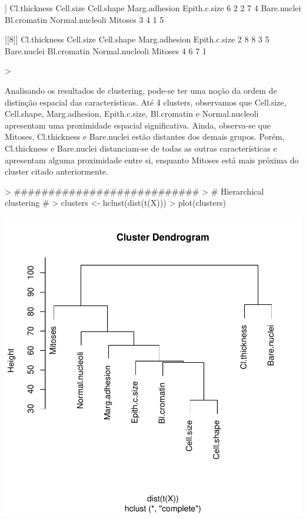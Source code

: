 \documentclass{article}
\begin{document}
\begin{Schunk}
\begin{Soutput}
[[7]]
   Cl.thickness       Cell.size      Cell.shape   Marg.adhesion    Epith.c.size 
              6               2               2               7               4 
    Bare.nuclei     Bl.cromatin Normal.nucleoli         Mitoses 
              3               4               1               5 

[[8]]
   Cl.thickness       Cell.size      Cell.shape   Marg.adhesion    Epith.c.size 
              2               8               8               3               5 
    Bare.nuclei     Bl.cromatin Normal.nucleoli         Mitoses 
              4               6               7               1 
\end{Soutput}
\begin{Sinput}
> 
\end{Sinput}
\end{Schunk}
Analisando os resultados de clustering, pode-se ter uma noção da ordem de distinção espacial das características. Até 4 clusters, observamos que Cell.size, Cell.shape, Marg.adhesion, Epith.c.size, Bl.cromatin e Normal.nucleoli apresentam uma proximidade espacial significativa.
Ainda, observa-se que Mitoses, Cl.thickness e Bare.nuclei estão distantes dos demais grupos. Porém, Cl.thickness e Bare.nuclei distanciam-se de todas as outras características e apresentam alguma proximidade entre si, enquanto Mitoses está mais próxima do cluster citado anteriormente.

\begin{Schunk}
\begin{Sinput}
> ###########################
> # Hierarchical clustering #
> clusters <- hclust(dist(t(X)))
> plot(clusters)
\end{Sinput}
\end{Schunk}
\includegraphics{selecao-005}
\end{document}
